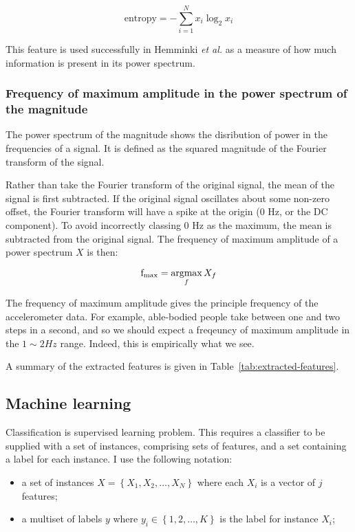         $$\mathrm{entropy} = -\sum\limits_{i=1}^N x_i \log_2 x_i$$
        
        This feature is used successfully in Hemminki \emph{et al.}\cite{hemminki2013accelerometer} as a measure of how much information is present in its power spectrum.
        
      \subsubsection{Frequency of maximum amplitude in the power spectrum of the magnitude}
        The power spectrum of the magnitude shows the disribution of power in the frequencies of a signal. It is defined as the squared magnitude of the Fourier transform of the signal.
        
        Rather than take the Fourier transform of the original signal, the mean of the signal is first subtracted. If the original signal oscillates about some non-zero offset, the Fourier transform will have a spike at the origin (0 \si{Hz}, or the DC component). To avoid incorrectly classing 0 \si{Hz} as the maximum, the mean is subtracted from the original signal. The frequency of maximum amplitude of a power spectrum $X$ is then:
        
        $$\mathrm{f}_\mathrm{max} = \operatorname*{argmax}_f X_f$$
        
        The frequency of maximum amplitude gives the principle frequency of the accelerometer data. For example, able-bodied people take between one and two steps in a second, and so we should expect a freqeuncy of maximum amplitude in the $1 \sim 2 \si{Hz}$ range. Indeed, this is empirically what we see.
        
        A summary of the extracted features is given in Table~\ref{tab:extracted-features}.
    \subsection{Machine learning}
      Classification is supervised learning problem. This requires a classifier to be supplied with a set of instances, comprising sets of features, and a set containing a label for each instance. I use the following notation:
      \begin{itemize}
        \item a set of instances $X = \left\{X_1, X_2, \dots, X_N\right\}$ where each $X_i$ is a vector of $j$ features;
        \item a multiset of labels $y$ where $y_i \in \left\{1, 2, \dots, K\right\}$ is the label for instance $X_i$;
      \end{itemize}  
      
